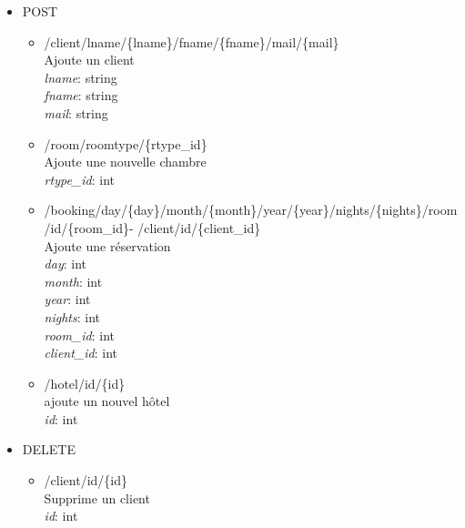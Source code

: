 \documentclass{article}
\begin{document}
\begin{itemize}
\begin{itemize}
	\item /client/id/\{id\}/mail/\{mail\}\\
		Met \`a jour le mail d'un client \\
		\textit{id}: int \\
		\textit{mail}: string

	\item /booking/id/\{id\}/state/\{state\} \\
		Met \`a jour la r\'eservation \\
		\textit{id}: int \\
		\textit{state}: int

	\item /room/id/\{id\}/roomtype/\{rtype\_id\} \\
		Met \`a jour une chambre \\
		\textit{id}: int \\
		\textit{rtype\_id}: int
	\end{itemize}

	\vspace{1cm}
\item POST
	\begin{itemize}

		\item /client/lname/\{lname\}/fname/\{fname\}/mail/\{mail\}\\
		Ajoute un client \\
		\textit{lname}: string \\
		\textit{fname}: string \\
		\textit{mail}: string

	\item /room/roomtype/\{rtype\_id\}\\
		Ajoute une nouvelle chambre \\
		\textit{rtype\_id}: int


	\item /booking/day/\{day\}/month/\{month\}/year/\{year\}/nights/\{nights\}/room/id/\{room\_id\}- /client/id/\{client\_id\}\\
		Ajoute une r\'eservation \\
		\textit{day}: int \\
		\textit{month}: int \\
		\textit{year}: int \\
		\textit{nights}: int \\
		\textit{room\_id}: int \\
		\textit{client\_id}: int

	\item /hotel/id/\{id\}\\
		ajoute un nouvel h\^{o}tel \\
		\textit{id}: int
	\end{itemize}
\pagebreak
	\item DELETE
	\begin{itemize}
		\item /client/id/\{id\}\\
		Supprime un client \\
		\textit{id}: int



\end{itemize}
\end{itemize}
\end{document}
